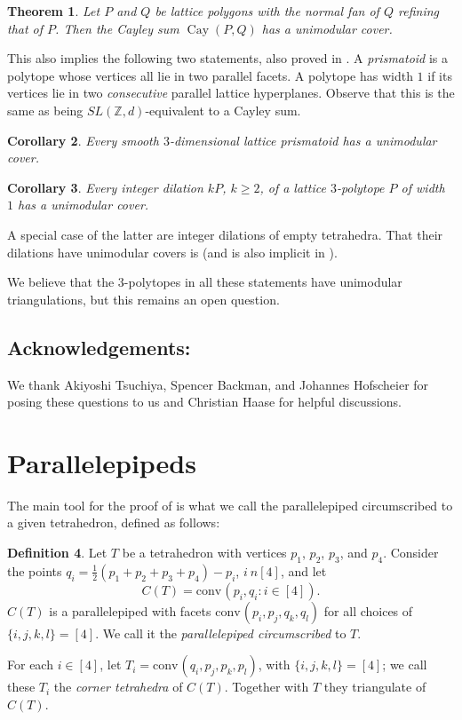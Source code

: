 \documentclass{amsart}
\theoremstyle{plain}
\newtheorem{theorem}{Theorem}[section]
\newtheorem{corollary}[theorem]{Corollary}
\theoremstyle{definition}
\newtheorem{definition}[theorem]{Definition}
\newcommand{\Z}{ \ensuremath{\mathbb{Z}}}
\newcommand{\conv}{\ensuremath{\mathrm{conv}}\hspace{1pt}}
\newcommand{\cayley}{\operatorname{Cay}}
\begin{document}
\begin{theorem}
\label{thm:cayley}
Let $P$ and $Q$ be lattice polygons with the normal fan of $Q$ refining that of $P$. Then the Cayley sum $\cayley(P,Q)$ has a unimodular cover.
\end{theorem}

This also implies the following two statements, also proved in .
A  \emph{prismatoid} is a polytope whose vertices all lie in two parallel facets. 
A polytope has width $1$ if its vertices lie in two \emph{consecutive} parallel lattice hyperplanes. Observe that this is the same as being $SL(\Z,d)$-equivalent to a Cayley sum.

\begin{corollary}
\label{coro:prismatoid}
Every smooth $3$-dimensional lattice prismatoid has a unimodular cover.
\end{corollary}

\begin{corollary}
\label{coro:width1}
Every integer dilation $kP$, $k\ge 2$, of a lattice $3$-polytope $P$ of width $1$ has a unimodular cover.
\end{corollary}

A special case of the latter are integer dilations of empty tetrahedra. That their dilations have
unimodular covers is \cite[Cor.~4.2]{SantosZiegler} (and is also implicit in \cite{KantorSarkaria}).

We believe that the $3$-polytopes in all these statements have unimodular triangulations, but this remains an open question.


\subsection*{Acknowledgements:} We thank Akiyoshi Tsuchiya, Spencer Backman, and Johannes Hofscheier for posing these questions to us and 
Christian Haase for helpful discussions.


\section{Parallelepipeds}
\label{sec:parallelepipeds}

The main tool for the proof of  is what we call the parallelepiped circumscribed to a given tetrahedron, defined as follows:

\begin{definition}
\label{def:circunpara}
Let $T$ be a tetrahedron with vertices $p_1$, $p_2$, $p_3$, and $p_4$. Consider the points $q_i= \frac12 (p_1+p_2+p_3+p_4) - p_i$, $i\ n [4]$, and let
\[
C(T)=\conv(p_i,q_i: i\in[4]).
\] 
$C(T)$ is a parallelepiped with facets $\conv(p_i, p_j, q_k, q_l)$ for all choices of $\{i,j,k,l\}=[4]$. We call it the \emph{parallelepiped circumscribed} to $T$.

For each $i \in [4]$, let $T_i=\conv(q_i, p_j, p_k, p_l)$, with $\{i,j,k,l\}=[4]$; we call these $T_i$ the \emph{corner tetrahedra} of $C(T)$. Together with $T$ they triangulate of $C(T)$.
\end{definition}
\end{document}
